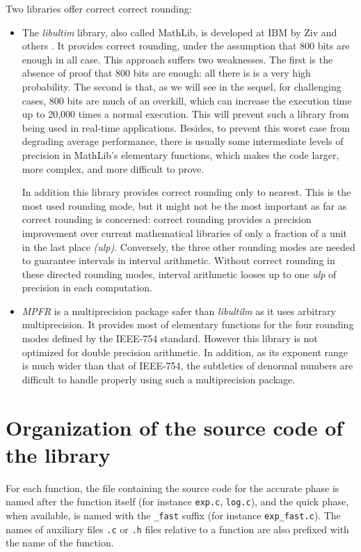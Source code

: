 Two libraries offer correct correct rounding:
\begin{itemize}
\item The \emph{libultim} library, also called MathLib, is developed at
  IBM by Ziv and others \cite{IBMlibultimweb}. It provides correct rounding,
  under the assumption that 800 bits are enough in all case. This
  approach suffers two weaknesses. The first is the absence of proof
  that 800 bits are enough: all there is is a very high probability.
  The second is that, as we will see in the sequel, for challenging
  cases, 800 bits are much of an overkill, which can increase the
  execution time up to 20,000 times a normal execution. This will
  prevent such a library from being used in real-time applications.
  Besides, to prevent this worst case from degrading average
  performance, there is usually some intermediate levels of precision
  in MathLib's elementary functions, which makes the code larger, more
  complex, and more difficult to prove.
  
  In addition this library provides correct rounding only to nearest.
  This is the most used rounding mode, but it might not be the most
  important as far as correct rounding is concerned: correct rounding
  provides a precision improvement over current mathematical libraries
  of only a fraction of a {unit in the last place} \emph{(ulp)}.
  Conversely, the three other rounding modes are needed to guarantee
  intervals in interval arithmetic.  Without correct rounding in these
  directed rounding modes, interval arithmetic looses up to one
  \emph{ulp} of precision in each computation.
  
\item \emph{MPFR} is a multiprecision package safer than
  \emph{libultilm} as it uses arbitrary multiprecision. It provides
  most of elementary functions for the four rounding modes defined by
  the IEEE-754 standard. However this library is not optimized for
  double precision arithmetic. In addition, as its exponent range is
  much wider than that of IEEE-754, the subtleties of denormal numbers
  are difficult to handle properly using such a multiprecision
  package.
\end{itemize}



\section{Organization of the source code of the library}

For each function, the file containing the source code for the
accurate phase is named after the function itself (for instance
\texttt{exp.c}, \texttt{log.c}), and the quick phase, when available,
is named with the \texttt{\_fast} suffix (for instance
\texttt{exp\_fast.c}). The names of auxiliary files \texttt{.c} or
\texttt{.h} files relative to a function are also prefixed with the
name of the function.

